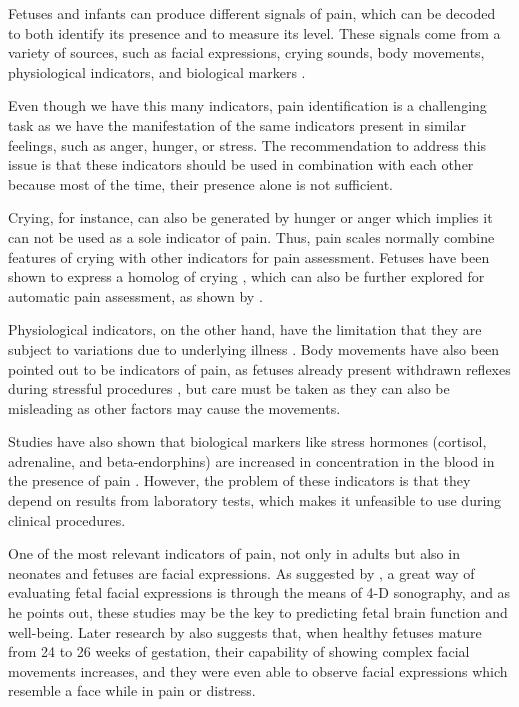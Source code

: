 Fetuses and infants can produce different signals of pain, which can be decoded to both identify its presence and to measure its level. These signals come from a variety of sources, such as facial expressions, crying sounds, body movements, physiological indicators, and biological markers \citep{Bellieni2012}. 

Even though we have this many indicators, pain identification is a challenging task as we have the manifestation of the same indicators present in similar feelings, such as anger, hunger, or stress. The recommendation to address this issue is that these indicators should be used in combination with each other \citep{Bellieni2012} because most of the time, their presence alone is not sufficient. 

Crying, for instance, can also be generated by hunger or anger which implies it can not be used as a sole indicator of pain.  Thus, pain scales normally combine features of crying with other indicators for pain assessment. Fetuses have been shown to express a homolog of crying \citep{Gingras2005}, which can also be further explored for automatic pain assessment, as shown by \cite{abs-1909-02543}. 

Physiological indicators, on the other hand, have the limitation that they are subject to variations due to underlying illness \citep{sweet1998physiological}. Body movements have also been pointed out to be indicators of pain, as fetuses already present withdrawn reflexes during stressful procedures \citep{Zimmermann1991}, but care must be taken as they can also be misleading as other factors may cause the movements.

Studies have also shown that biological markers like stress hormones (cortisol, adrenaline, and beta-endorphins) are increased in concentration in the blood in the presence of pain \citep{giannakoulopoulos1994fetal}. However, the problem of these indicators is that they depend on results from laboratory tests, which makes it unfeasible to use during clinical procedures.

One of the most relevant indicators of pain, not only in adults but also in neonates and fetuses are facial expressions. As suggested by \cite{Yan2006}, a great way of evaluating fetal facial expressions is through the means of 4-D sonography, and as he points out, these studies may be the key to predicting fetal brain function and well-being. Later research by \cite{Reissland2011, Reissland2013} also suggests that, when healthy fetuses mature from 24 to 26 weeks of gestation, their capability of showing complex facial movements increases, and they were even able to observe facial expressions which resemble a face while in pain or distress.

